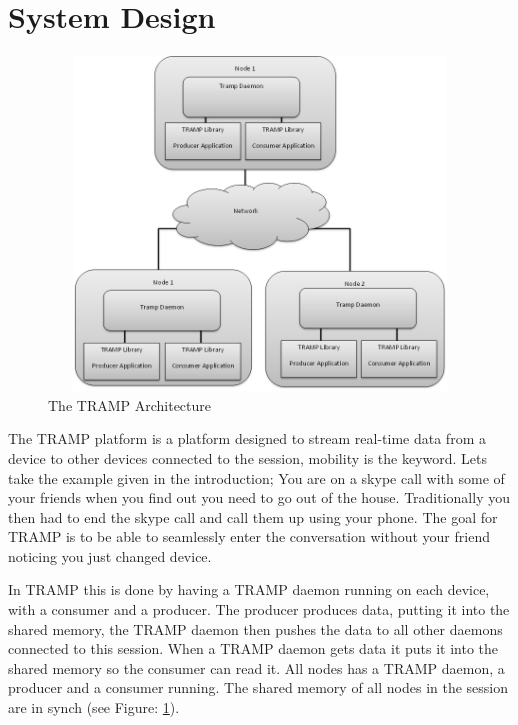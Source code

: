 \section{System Design}
\label{sec:design}

\begin{center}
\begin{figure}[ht!]
 \centering
 \includegraphics[width=6.0in, height=3.5in]{tramp_arch2.png}
\caption{The TRAMP Architecture}
\label{tramparc}
\end{figure}
\end{center}

The TRAMP platform is a platform designed to stream real-time data from a device to other devices connected to the session, mobility is the keyword. Lets take the example given in the introduction; You are on a skype call with some of your friends when you find out you need to go out of the house. Traditionally you then had to end the skype call and call them up using your phone. The goal for TRAMP is to be able to seamlessly enter the conversation without your friend noticing you just changed device.

In TRAMP this is done by having a TRAMP daemon running on each device, with a consumer and a producer. The producer produces data, putting it into the shared memory, the TRAMP daemon then pushes the data to all other daemons connected to this session. When a TRAMP daemon gets data it puts it into the shared memory so the consumer can read it. All nodes has a TRAMP daemon, a producer and a consumer running. The shared memory of all nodes in the session are in synch (see Figure: \ref{tramparc}).

